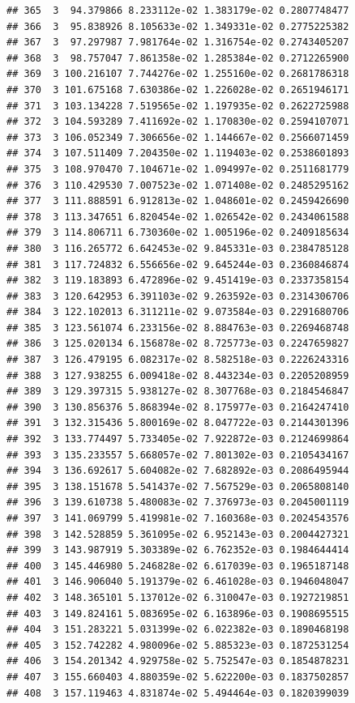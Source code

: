 \documentclass[article]{jss}\usepackage[]{graphicx}\usepackage[]{xcolor}
\makeatletter
\newenvironment{kframe}{%
 \def\at@end@of@kframe{}%
 \ifinner\ifhmode%
  \def\at@end@of@kframe{\end{minipage}}%
  \begin{minipage}{\columnwidth}%
 \fi\fi%
 \def\FrameCommand##1{\hskip\@totalleftmargin \hskip-\fboxsep
 \colorbox{shadecolor}{##1}\hskip-\fboxsep
     \hskip-\linewidth \hskip-\@totalleftmargin \hskip\columnwidth}%
 \MakeFramed {\advance\hsize-\width
   \@totalleftmargin\z@ \linewidth\hsize
   \@setminipage}}%
 {\par\unskip\endMakeFramed%
 \at@end@of@kframe}
\newenvironment{knitrout}{}{} %
\makeatother
\begin{document}
\begin{knitrout}
\begin{kframe}
\begin{verbatim}
## 365  3  94.379866 8.233112e-02 1.383179e-02 0.2807748477
## 366  3  95.838926 8.105633e-02 1.349331e-02 0.2775225382
## 367  3  97.297987 7.981764e-02 1.316754e-02 0.2743405207
## 368  3  98.757047 7.861358e-02 1.285384e-02 0.2712265900
## 369  3 100.216107 7.744276e-02 1.255160e-02 0.2681786318
## 370  3 101.675168 7.630386e-02 1.226028e-02 0.2651946171
## 371  3 103.134228 7.519565e-02 1.197935e-02 0.2622725988
## 372  3 104.593289 7.411692e-02 1.170830e-02 0.2594107071
## 373  3 106.052349 7.306656e-02 1.144667e-02 0.2566071459
## 374  3 107.511409 7.204350e-02 1.119403e-02 0.2538601893
## 375  3 108.970470 7.104671e-02 1.094997e-02 0.2511681779
## 376  3 110.429530 7.007523e-02 1.071408e-02 0.2485295162
## 377  3 111.888591 6.912813e-02 1.048601e-02 0.2459426690
## 378  3 113.347651 6.820454e-02 1.026542e-02 0.2434061588
## 379  3 114.806711 6.730360e-02 1.005196e-02 0.2409185634
## 380  3 116.265772 6.642453e-02 9.845331e-03 0.2384785128
## 381  3 117.724832 6.556656e-02 9.645244e-03 0.2360846874
## 382  3 119.183893 6.472896e-02 9.451419e-03 0.2337358154
## 383  3 120.642953 6.391103e-02 9.263592e-03 0.2314306706
## 384  3 122.102013 6.311211e-02 9.073584e-03 0.2291680706
## 385  3 123.561074 6.233156e-02 8.884763e-03 0.2269468748
## 386  3 125.020134 6.156878e-02 8.725773e-03 0.2247659827
## 387  3 126.479195 6.082317e-02 8.582518e-03 0.2226243316
## 388  3 127.938255 6.009418e-02 8.443234e-03 0.2205208959
## 389  3 129.397315 5.938127e-02 8.307768e-03 0.2184546847
## 390  3 130.856376 5.868394e-02 8.175977e-03 0.2164247410
## 391  3 132.315436 5.800169e-02 8.047722e-03 0.2144301396
## 392  3 133.774497 5.733405e-02 7.922872e-03 0.2124699864
## 393  3 135.233557 5.668057e-02 7.801302e-03 0.2105434167
## 394  3 136.692617 5.604082e-02 7.682892e-03 0.2086495944
## 395  3 138.151678 5.541437e-02 7.567529e-03 0.2065808140
## 396  3 139.610738 5.480083e-02 7.376973e-03 0.2045001119
## 397  3 141.069799 5.419981e-02 7.160368e-03 0.2024543576
## 398  3 142.528859 5.361095e-02 6.952143e-03 0.2004427321
## 399  3 143.987919 5.303389e-02 6.762352e-03 0.1984644414
## 400  3 145.446980 5.246828e-02 6.617039e-03 0.1965187148
## 401  3 146.906040 5.191379e-02 6.461028e-03 0.1946048047
## 402  3 148.365101 5.137012e-02 6.310047e-03 0.1927219851
## 403  3 149.824161 5.083695e-02 6.163896e-03 0.1908695515
## 404  3 151.283221 5.031399e-02 6.022382e-03 0.1890468198
## 405  3 152.742282 4.980096e-02 5.885323e-03 0.1872531254
## 406  3 154.201342 4.929758e-02 5.752547e-03 0.1854878231
## 407  3 155.660403 4.880359e-02 5.622200e-03 0.1837502857
## 408  3 157.119463 4.831874e-02 5.494464e-03 0.1820399039

\end{verbatim}
\end{kframe}
\end{knitrout}
\end{document}
